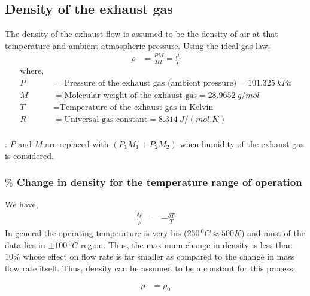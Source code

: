 \subsection{Density of the exhaust gas}

The density of the exhaust flow is assumed to be the density of air at that
temperature and ambient atmospheric pressure. Using the ideal gas law:
\begin{align}
    \rho &= \frac{PM}{R T} = \frac{\mu}{T}
\end{align}
\begin{align*}
    \text{where, } &\\
    P &= \text{Pressure of the exhaust gas (ambient pressure)} = 101.325 \: kPa\\
    M &= \text{Molecular weight of the exhaust gas} = 28.9652 \: g/mol\\
    T &= \text{Temperature of the exhaust gas in Kelvin}\\
    R &= \text{Universal gas constant} = 8.314 \: J/(mol.K)\\
\end{align*}

: $P$ and $M$ are replaced with $(P_1 M_1 + P_2 M_2)$ when humidity of the exhaust gas is considered.

\subsubsection{$\%$ Change in density for the temperature range of operation}
We have,
\begin{align*}
    \frac{\delta \rho}{\rho} &= -\frac{\delta T}{T}
\end{align*}
In general the operating temperature is very his ($250 \,^0 C \approx 500 K$) and most of the data lies in $\pm 100 \, ^0 C$ region. Thus, the maximum change in density is less than $10\%$ whose effect on flow rate is far smaller as compared to the change in mass flow rate itself. Thus, density can be assumed to be a constant for this process.

\begin{align}
    \rho &= \rho_0
\end{align}



